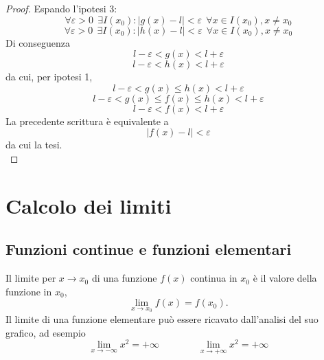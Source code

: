 \documentclass{book}     %
\begin{document}
        \begin{proof}
            Espando l'ipotesi 3:
            \[\forall \varepsilon > 0 ~~\exists I(x_0) : |g(x)-l|<\varepsilon~~\forall x \in I(x_0), x\neq x_0\]
            \[\forall \varepsilon > 0 ~~\exists I(x_0) : |h(x)-l|<\varepsilon~~\forall x \in I(x_0), x\neq x_0\]
            Di conseguenza 
            \[l-\varepsilon < g(x) <l+\varepsilon\]
            \[l-\varepsilon < h(x) <l+\varepsilon\]
            da cui, per ipotesi 1, 
            \[l-\varepsilon < g(x)\leq h(x) <l+\varepsilon\]
            \[l-\varepsilon < g(x) \leq f(x) \leq h(x) <l+\varepsilon\]
            \[l-\varepsilon < f(x) <l+\varepsilon\]
            La precedente scrittura è equivalente a 
            \[|f(x)-l|<\varepsilon\]
            da cui la tesi.\\
        \end{proof}
\section{Calcolo dei limiti}
\subsection{Funzioni continue e funzioni elementari}
Il limite per $x\to x_0$ di una funzione $f(x)$ continua in $x_0$ è il valore della funzione in $x_0$, 
\[\lim_{x\to x_0}f(x) = f(x_0).\]
Il limite di una funzione elementare può essere ricavato dall'analisi del suo grafico, ad esempio
\[\lim_{x\to -\infty}x^2=+\infty \qquad \qquad \lim_{x\to +\infty}x^2=+\infty\]
\end{document}
